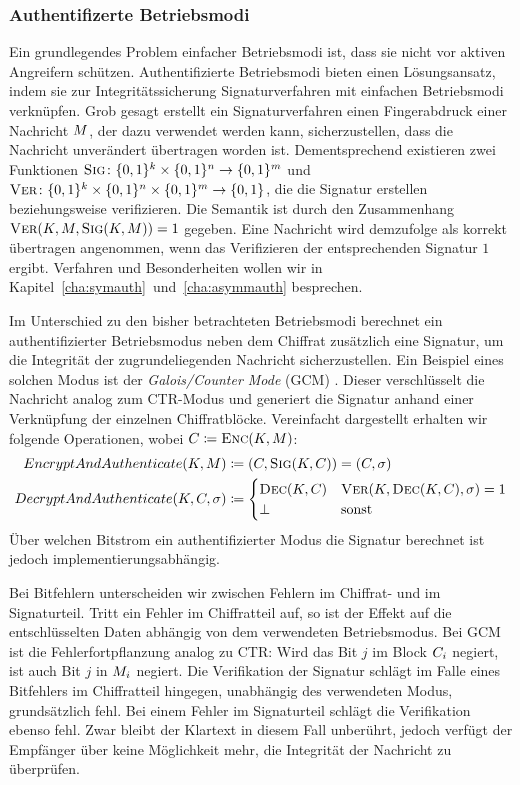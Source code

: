 \subsubsection{Authentifizerte Betriebsmodi}
Ein grundlegendes Problem einfacher Betriebsmodi ist, dass sie nicht vor aktiven Angreifern schützen. Authentifizierte Betriebsmodi bieten einen Lösungsansatz, indem sie zur Integritätssicherung Signaturverfahren \indexSig mit einfachen Betriebsmodi verknüpfen. Grob gesagt erstellt ein Signaturverfahren einen Fingerabdruck einer Nachricht $M$, der dazu verwendet werden kann, sicherzustellen, dass die Nachricht unverändert übertragen worden ist. Dementsprechend existieren zwei Funktionen $\textsc{Sig} \colon \{0,1\}^k \times \{0,1\}^n \rightarrow \{0,1\}^m$ und $\textsc{Ver} \colon \{0,1\}^k \times \{0,1\}^n \times \{0,1\}^m \rightarrow \{0,1\}$, die die Signatur erstellen beziehungsweise verifizieren. Die Semantik ist durch den Zusammenhang $\textsc{Ver}(K,M,\textsc{Sig}(K, M)) = 1$ gegeben. Eine Nachricht wird demzufolge als korrekt übertragen angenommen, wenn das Verifizieren der entsprechenden Signatur $1$ ergibt.
Verfahren und Besonderheiten wollen wir in Kapitel~\ref{cha:symauth}~und~\ref{cha:asymmauth} besprechen.

Im Unterschied zu den bisher betrachteten Betriebsmodi berechnet ein authentifizierter Betriebsmodus neben dem Chiffrat zusätzlich eine Signatur, um die Integrität der zugrundeliegenden Nachricht sicherzustellen. Ein Beispiel eines solchen Modus ist der \emph{Galois/Counter Mode} (GCM) \cite{NIST_GCM05}. Dieser verschlüsselt die Nachricht analog zum CTR-Modus und generiert die Signatur anhand einer Verknüpfung der einzelnen Chiffratblöcke. Vereinfacht dargestellt erhalten wir folgende Operationen, wobei $C \coloneqq \textsc{Enc}(K, M)$:
\begin{align*}
	EncryptAndAuthenticate(K, M) &\coloneqq (C, \textsc{Sig}(K, C)) = (C, \sigma)\\
	DecryptAndAuthenticate(K, C, \sigma) &\coloneqq \begin{cases}
		\textsc{Dec}(K, C) & \textsc{Ver}(K, \textsc{Dec}(K, C), \sigma) = 1 \\
		\bot & \textnormal{sonst}
	\end{cases}
\end{align*}
Über welchen Bitstrom ein authentifizierter Modus die Signatur berechnet ist jedoch implementierungsabhängig.

Bei Bitfehlern unterscheiden wir zwischen Fehlern im Chiffrat- und im Signaturteil. Tritt ein Fehler im Chiffratteil auf, so ist der Effekt auf die entschlüsselten Daten abhängig von dem verwendeten Betriebsmodus. Bei GCM ist die Fehlerfortpflanzung analog zu CTR: Wird das Bit $j$ im Block $C_i$ negiert, ist auch Bit $j$ in $M_i$ negiert. Die Verifikation der Signatur schlägt im Falle eines Bitfehlers im Chiffratteil hingegen, unabhängig des verwendeten Modus, grundsätzlich fehl. Bei einem Fehler im Signaturteil schlägt die Verifikation ebenso fehl. Zwar bleibt der Klartext in diesem Fall unberührt, jedoch verfügt der Empfänger über keine Möglichkeit mehr, die Integrität der Nachricht zu überprüfen.

